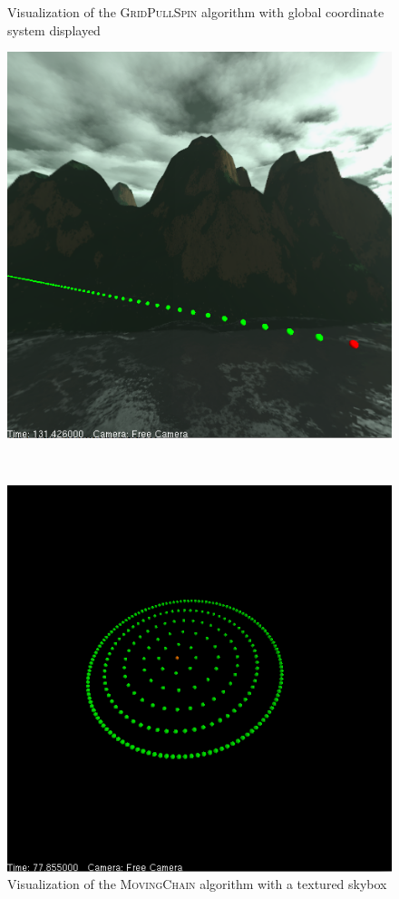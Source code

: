 \begin{figure}[ht]
\begin{minipage}[t]{0.46\textwidth}
		\caption{Visualization of the \textsc{GridPullSpin} algorithm with global coordinate system displayed}
		\label{WII:fig:gridpullspin2d}
	\end{minipage}
	\begin{minipage}[t]{0.46\textwidth}
		\centering
		\includegraphics[width=\textwidth]{chapter_whatitis_fig/moving-chain.png}
		\caption{Visualization of the \textsc{MovingChain} algorithm with a textured skybox}
		\label{WII:fig:moving-chain}
	\end{minipage}$\quad$
	\begin{minipage}[t]{0.46\textwidth}
		\centering
		\includegraphics[width=\textwidth]{chapter_whatitis_fig/cloning-movement.png}

\end{minipage}
\end{figure}
